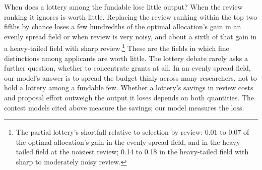 \documentclass[article, 11pt, reqno]{amsart}
\theoremstyle{named}
\begin{document}
When does a lottery among the fundable lose little output? When the review ranking it ignores is worth little. Replacing the review ranking within the top two fifths by chance loses a few hundredths of the optimal allocation's gain in an evenly spread field or when review is very noisy, and about a sixth of that gain in a heavy-tailed field with sharp review.\footnote{The partial lottery's shortfall relative to selection by review: 0.01 to 0.07 of the optimal allocation's gain in the evenly spread field, and in the heavy-tailed field at the noisiest review; 0.14 to 0.18 in the heavy-tailed field with sharp to moderately noisy review.} These are the fields in which fine distinctions among applicants are worth little. The lottery debate rarely asks a further question, whether to concentrate grants at all. In an evenly spread field, our model's answer is to spread the budget thinly across many researchers, not to hold a lottery among a fundable few. Whether a lottery's savings in review costs and proposal effort outweigh the output it loses depends on both quantities. The contest models cited above measure the savings; our model measures the loss.
\end{document}
